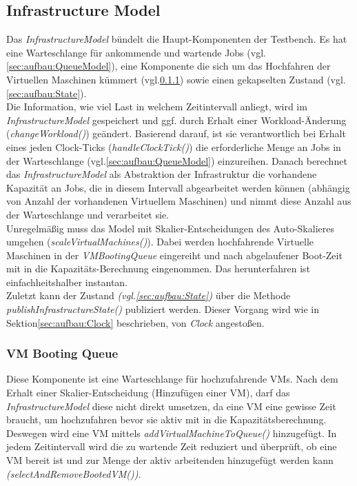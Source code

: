 \subsection{Infrastructure Model}
Das \textit{InfrastructureModel} bündelt die Haupt-Komponenten der Testbench. Es hat eine Warteschlange für ankommende und wartende Jobs (vgl.\ref{sec:aufbau:QueueModel}), eine Komponente die sich um das Hochfahren der Virtuellen Maschinen kümmert (vgl.\ref{sec:aufbau:BootinQueu}) sowie einen gekapselten Zustand (vgl.\ref{sec:aufbau:State}). \\
Die Information, wie viel Last in welchem Zeitintervall anliegt, wird im \textit{InfrastructureModel} gespeichert und ggf. durch Erhalt einer Workload-Änderung (\textit{changeWorkload()}) geändert. Basierend darauf, ist sie verantwortlich bei Erhalt eines jeden Clock-Ticks (\textit{handleClockTick()}) die erforderliche Menge an Jobs in der Warteschlange (vgl.\ref{sec:aufbau:QueueModel}) einzureihen. Danach berechnet das \textit{InfrastructureModel} als Abstraktion der Infrastruktur die vorhandene Kapazität an Jobs, die in diesem Intervall abgearbeitet werden können (abhängig von Anzahl der vorhandenen Virtuellem Maschinen) und nimmt diese Anzahl aus der Warteschlange und verarbeitet sie. \\
Unregelmäßig muss das Model mit Skalier-Entscheidungen des Auto-Skalieres umgehen (\textit{scaleVirtualMachines()}). Dabei werden hochfahrende Virtuelle Maschinen in der \textit{VMBootingQueue} eingereiht und nach abgelaufener Boot-Zeit mit in die Kapazitäts-Berechnung eingenommen. Das herunterfahren ist einfachheitshalber instantan.\\
Zuletzt kann der Zustand \textit{(vgl.\ref{sec:aufbau:State})} über die Methode \textit{publishInfrastructureState()} publiziert werden. Dieser Vorgang wird wie in Sektion\ref{sec:aufbau:Clock} beschrieben, von \textit{Clock} angestoßen.

\subsubsection{VM Booting Queue}
\label{sec:aufbau:BootinQueu}
Diese Komponente ist eine Warteschlange für hochzufahrende VMs. Nach dem Erhalt einer Skalier-Entscheidung (Hinzufügen einer VM), darf das \textit{InfrastructureModel} diese nicht direkt umsetzen, da eine VM eine gewisse Zeit braucht, um hochzufahren bevor sie aktiv mit in die Kapazitätsberechnung. Deswegen wird eine VM mittels \textit{addVirtualMachineToQueue()} hinzugefügt. In jedem Zeitintervall wird die zu wartende Zeit reduziert und überprüft, ob eine VM bereit ist und zur Menge der aktiv arbeitenden hinzugefügt werden kann \textit{(selectAndRemoveBootedVM())}.  


